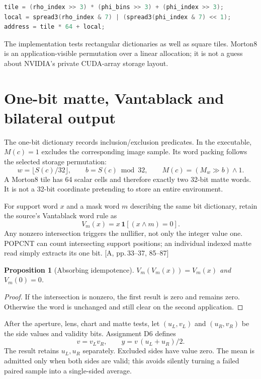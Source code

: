 \documentclass[11pt,a4paper]{article}
\newcommand{\src}[1]{\textcolor{muted}{[A, #1]}}
\newtheorem{proposition}{Proposition}[section]
\begin{document}
\begin{lstlisting}[language=C++]
tile = (rho_index >> 3) * (phi_bins >> 3) + (phi_index >> 3);
local = spread3(rho_index & 7) | (spread3(phi_index & 7) << 1);
address = tile * 64 + local;
\end{lstlisting}
The implementation tests rectangular dictionaries as well as square tiles. Morton8 is an application-visible permutation over a linear allocation; it is not a guess about NVIDIA's private CUDA-array storage layout.
\clearpage

\section{One-bit matte, Vantablack and bilateral output}
The one-bit dictionary records inclusion/exclusion predicates. In the executable, $M(c)=1$ excludes the corresponding image sample. Its word packing follows the selected storage permutation:
\begin{equation}
w=\lfloor S(c)/32\rfloor,\qquad b=S(c)\bmod32,\qquad
M(c)=(M_w\gg b)\land1.
\end{equation}
A Morton8 tile has 64 scalar cells and therefore exactly two 32-bit matte words. It is not a 32-bit coordinate pretending to store an entire environment.

For support word $x$ and a mask word $m$ describing the same bit dictionary, retain the source's Vantablack word rule as
\begin{equation}
V_m(x)=x\,\mathbf1[(x\land m)=0].
\end{equation}
Any nonzero intersection triggers the nullifier, not only the integer value one. POPCNT can count intersecting support positions; an individual indexed matte read simply extracts its one bit. \src{pp.\,33--37, 85--87}

\begin{proposition}[Absorbing idempotence]
$V_m(V_m(x))=V_m(x)$ and $V_m(0)=0$.
\end{proposition}
\begin{proof}
If the intersection is nonzero, the first result is zero and remains zero. Otherwise the word is unchanged and still clear on the second application.
\end{proof}

After the aperture, lens, chart and matte tests, let $(u_L,v_L)$ and $(u_R,v_R)$ be the side values and validity bits. Assignment D6 defines
\begin{equation}
v=v_Lv_R,\qquad y=v\,(u_L+u_R)/2.
\end{equation}
The result retains $u_L,u_R$ separately. Excluded sides have value zero. The mean is admitted only when both sides are valid; this avoids silently turning a failed paired sample into a single-sided average.
\end{document}
